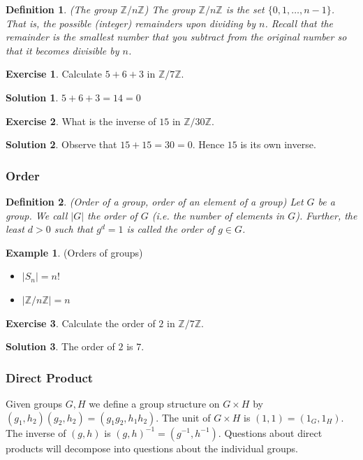 \documentclass[12pt]{article}
\newtheorem{definition}{Definition}
\theoremstyle{definition}
\newtheorem{example}{Example}
\newtheorem{exercise}{Exercise}
\theoremstyle{definition}
\newtheorem{solution}{Solution}
\begin{document}
\begin{definition}(The group $\mathbb{Z} / n \mathbb{Z}$)
The group $\mathbb{Z} / n \mathbb{Z}$ is the set $\{0,1,\ldots,n-1\}$. That is, the possible (integer) remainders upon dividing by $n$. Recall that the remainder is the smallest number that you subtract from the original number so that it becomes divisible by $n$. 
\end{definition}
\begin{exercise}
Calculate $5 + 6 + 3$ in $\mathbb{Z} / 7 \mathbb{Z}$.
\end{exercise}
\begin{solution}
$5 + 6+ 3 = 14 = 0$
\end{solution}
\begin{exercise}
What is the inverse of $15$ in $\mathbb{Z} / 30 \mathbb{Z}$.
\end{exercise}
\begin{solution}
Observe that $15 + 15 = 30 = 0$. Hence $15$ is its own inverse.
\end{solution}

\subsubsection{Order}

\begin{definition}(Order of a group, order of an element of a group)
Let $G$ be a group. We call $|G|$ the order of $G$ (i.e. the number of elements in $G$). Further, the least $d >0$ such that $g^d = 1$ is called the order of $g \in G$.
\end{definition}
\begin{example}(Orders of groups)
\begin{itemize}
\item $|S_n| = n!$
\item $|\mathbb{Z} / n \mathbb{Z}| = n$
\end{itemize}
\end{example}

\begin{exercise}
Calculate the order of $2$ in $\mathbb{Z} / 7 \mathbb{Z}$.
\end{exercise}
\begin{solution}
The order of $2$ is $7$.
\end{solution}

\subsubsection{Direct Product}
Given groups $G, H$ we define a group structure on $G \times H$ by $(g_1,h_2)(g_2,h_2) = (g_1g_2,h_1h_2)$. The unit of $G \times H$ is $(1,1) = (1_G, 1_H)$. The inverse of $(g,h)$ is $(g,h)^{-1} = (g^{-1}, h^{-1})$. Questions about direct products will decompose into questions about the individual groups. 
\end{document}
